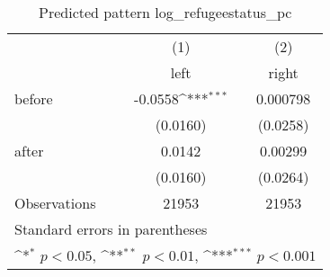 \begin{table}[htbp]\centering
\def\sym#1{\ifmmode^{#1}\else\(^{#1}\)\fi}
\caption{Predicted pattern log\_refugeestatus\_pc}
\begin{tabular}{l*{2}{c}}
\hline\hline
                    &\multicolumn{1}{c}{(1)}&\multicolumn{1}{c}{(2)}\\
                    &\multicolumn{1}{c}{left}&\multicolumn{1}{c}{right}\\
\hline
before              &     -0.0558\sym{***}&    0.000798         \\
                    &    (0.0160)         &    (0.0258)         \\
[1em]
after               &      0.0142         &     0.00299         \\
                    &    (0.0160)         &    (0.0264)         \\
\hline
Observations        &       21953         &       21953         \\
\hline\hline
\multicolumn{3}{l}{\footnotesize Standard errors in parentheses}\\
\multicolumn{3}{l}{\footnotesize \sym{*} \(p<0.05\), \sym{**} \(p<0.01\), \sym{***} \(p<0.001\)}\\
\end{tabular}
\end{table}
